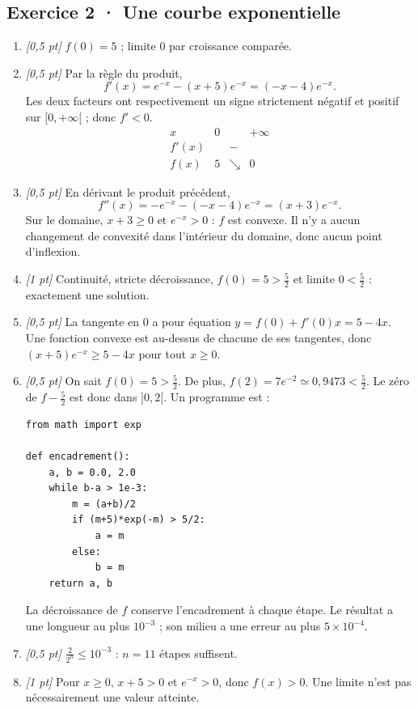 \subsection*{Exercice 2 · Une courbe exponentielle}\begin{enumerate}

\item \textit{[0,5 pt]} $f(0)=5$ ; limite $0$ par croissance comparée.

\item \textit{[0,5 pt]} Par la règle du produit,
\[f'(x)=e^{-x}-(x+5)e^{-x}=(-x-4)e^{-x}.\]
Les deux facteurs ont respectivement un signe strictement négatif et positif sur $[0,+\infty[$ ; donc $f'<0$.
\[\begin{array}{c|ccc}x&0&&+\infty\\\hline f'(x)&&-&\\\hline f(x)&5&\searrow&0\end{array}\]

\item \textit{[0,5 pt]} En dérivant le produit précédent,
\[f''(x)=-e^{-x}-(-x-4)e^{-x}=(x+3)e^{-x}.\]
Sur le domaine, $x+3\ge0$ et $e^{-x}>0$ : $f$ est convexe. Il n'y a aucun changement de convexité dans l'intérieur du domaine, donc aucun point d'inflexion.

\item \textit{[1 pt]} Continuité, stricte décroissance, $f(0)=5>\frac{5}{2}$ et limite $0<\frac{5}{2}$ : exactement une solution.

\item \textit{[0,5 pt]} La tangente en $0$ a pour équation $y=f(0)+f'(0)x=5-4x$. Une fonction convexe est au-dessus de chacune de ses tangentes, donc $(x+5)e^{-x}\ge 5-4x$ pour tout $x\ge0$.


\item \textit{[0,5 pt]} On sait $f(0)=5>\frac{5}{2}$. De plus, $f(2)=7e^{-2}\simeq0{,}9473<\frac{5}{2}$. Le zéro de $f-\frac{5}{2}$ est donc dans $]0,2[$. Un programme est :
\begin{lstlisting}
from math import exp

def encadrement():
    a, b = 0.0, 2.0
    while b-a > 1e-3:
        m = (a+b)/2
        if (m+5)*exp(-m) > 5/2:
            a = m
        else:
            b = m
    return a, b
\end{lstlisting}
La décroissance de $f$ conserve l'encadrement à chaque étape. Le résultat a une longueur au plus $10^{-3}$ ; son milieu a une erreur au plus $5\times10^{-4}$.

\item \textit{[0,5 pt]} $\frac{2}{2^n}\le10^{-3}$ : $n=11$ étapes suffisent.

\item \textit{[1 pt]} Pour $x\ge0$, $x+5>0$ et $e^{-x}>0$, donc $f(x)>0$. Une limite n'est pas nécessairement une valeur atteinte.

\end{enumerate}

